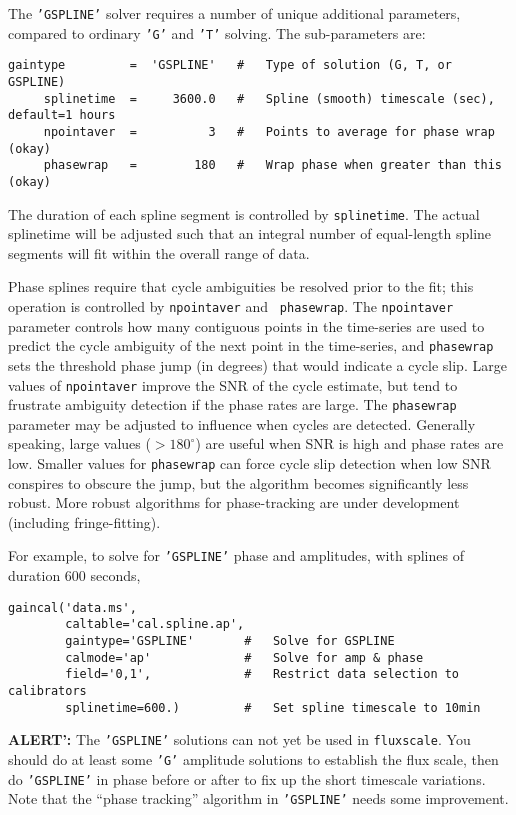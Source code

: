 The {\tt 'GSPLINE'} solver requires a number of unique additional parameters,
compared to ordinary {\tt 'G'} and {\tt 'T'} solving.  The sub-parameters are:
\small
\begin{verbatim}
gaintype         =  'GSPLINE'   #   Type of solution (G, T, or GSPLINE)
     splinetime  =     3600.0   #   Spline (smooth) timescale (sec), default=1 hours
     npointaver  =          3   #   Points to average for phase wrap (okay)
     phasewrap   =        180   #   Wrap phase when greater than this (okay)
\end{verbatim}
\normalsize

The duration of each spline segment is controlled by {\tt splinetime}.
The actual splinetime will be adjusted such that an integral number of
equal-length spline segments will fit within the overall range of
data.

Phase splines require that cycle ambiguities be resolved prior to the
fit; this operation is controlled by {\tt npointaver} and {\tt
phasewrap}.  The {\tt npointaver} parameter controls how many
contiguous points in the time-series are used to predict the cycle
ambiguity of the next point in the time-series, and {\tt phasewrap} sets
the threshold phase jump (in degrees) that would indicate a cycle
slip.  Large values of {\tt npointaver} improve the SNR of the cycle
estimate, but tend to frustrate ambiguity detection if the phase rates
are large.  The {\tt phasewrap} parameter may be adjusted to influence
when cycles are detected.  Generally speaking, large values
($>180^\circ$) are useful when SNR is high and phase rates are
low. Smaller values for {\tt phasewrap} can force cycle slip detection
when low SNR conspires to obscure the jump, but the algorithm becomes
significantly less robust.  More robust algorithms for phase-tracking
are under development (including fringe-fitting).

For example, to solve for {\tt 'GSPLINE'} phase and amplitudes, with
splines of duration 600 seconds, 
\small
\begin{verbatim}
gaincal('data.ms',
        caltable='cal.spline.ap',
        gaintype='GSPLINE'       #   Solve for GSPLINE
        calmode='ap'             #   Solve for amp & phase
        field='0,1',             #   Restrict data selection to calibrators
        splinetime=600.)         #   Set spline timescale to 10min
\end{verbatim}
\normalsize

{\bf ALERT':} The {\tt 'GSPLINE'} solutions can not yet be
used in {\tt fluxscale}.  You should do at least some {\tt 'G'}
amplitude solutions to establish the flux scale, then do 
{\tt 'GSPLINE'} in phase before or after to fix up the short 
timescale variations.  Note that the ``phase tracking'' algorithm
in {\tt 'GSPLINE'} needs some improvement.

